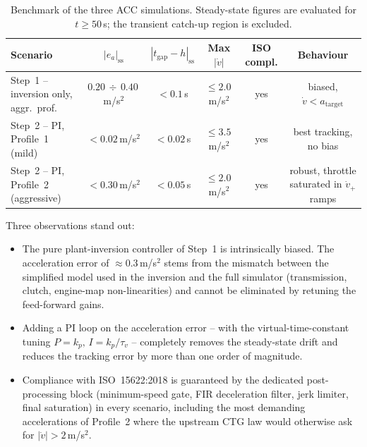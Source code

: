 \begin{table}[H]
    \centering
    \footnotesize
    \begin{tabular}{lccccc}
        \toprule
        \textbf{Scenario} &
        \textbf{$|e_a|_\text{ss}$} &
        \textbf{$|t_\text{gap}-h|_\text{ss}$} &
        \textbf{Max $|\dot v|$} &
        \textbf{ISO compl.} &
        \textbf{Behaviour} \\
        \midrule
        Step~1 -- inversion only, aggr.\ prof.\ &
            $0.20\,\div\,0.40$\,m/s$^2$ & $<0.1$\,s & $\le 2.0$\,m/s$^2$ &
            yes & biased, $\dot v < a_\text{target}$ \\
        Step~2 -- PI, Profile~1 (mild) &
            $<0.02$\,m/s$^2$ & $<0.02$\,s & $\le 3.5$\,m/s$^2$ &
            yes & best tracking, no bias \\
        Step~2 -- PI, Profile~2 (aggressive) &
            $<0.30$\,m/s$^2$ & $<0.05$\,s & $\le 2.0$\,m/s$^2$ &
            yes & robust, throttle saturated in $\dot v_+$ ramps \\
        \bottomrule
    \end{tabular}
    \caption{Benchmark of the three ACC simulations. Steady-state
    figures are evaluated for $t\ge 50$\,s; the transient catch-up
    region is excluded.}
    \label{tab:bench_p3}
\end{table}

Three observations stand out:
\begin{itemize}
    \item The pure plant-inversion controller of Step~1 is
          intrinsically biased. The acceleration error of $\approx
          0.3$\,m/s$^2$ stems from the mismatch between the simplified
          model used in the inversion and the full simulator
          (transmission, clutch, engine-map non-linearities) and
          cannot be eliminated by retuning the feed-forward gains.
    \item Adding a PI loop on the acceleration error -- with the
          virtual-time-constant tuning $P = k_p,\,I = k_p/\tau_v$ --
          completely removes the steady-state drift and reduces the
          tracking error by more than one order of magnitude.
    \item Compliance with ISO~15622:2018 is guaranteed by the
          dedicated post-processing block (minimum-speed gate, FIR
          deceleration filter, jerk limiter, final saturation) in
          every scenario, including the most demanding accelerations
          of Profile~2 where the upstream CTG law would otherwise
          ask for $|\dot v|>2$\,m/s$^2$.
\end{itemize}

